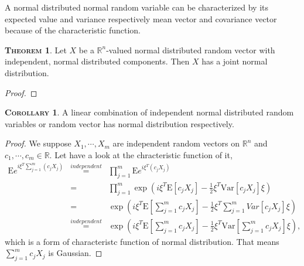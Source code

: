 \documentclass[a4paper, twoside, 11pt]{article}
\theoremstyle{definition}
\newtheorem{theorem}[definition]{\scshape Theorem}
\newtheorem{corollary}[definition]{\scshape Corollary}
\newcommand{\brkt}[1]{\left({#1} \right)}
\begin{document}
A normal distributed normal random variable can be characterized by its expected value and variance respectively mean vector and covariance vector because of the characteristic function.

\begin{theorem}
  Let $X$ be a $\mathbb{R}^{n}$-valued normal distributed random vector with independent, normal distributed components. Then $X$ has a joint normal distribution.
\end{theorem}

\begin{proof}
  
\end{proof}



\begin{corollary}
  A linear combination of independent normal distributed random variables or random vector has normal distribution respectively.
\end{corollary}

\begin{proof}
  We suppose $X_1, \cdots, X_m$ are independent random vectors  on $\mathbb{R}^n$ and $c_1, \cdots, c_m \in \mathbb{R}$. Let have a look at the chracteristic function of it,
  \begin{eqnarray*}
	\mathrm{E}e^{i\xi^T\sum_{j=1}^m(c_jX_j)} &\overset{independent}{=}&\prod_{j=1}^{m} \mathrm{E}e^{i\xi^T(c_jX_j)}\\
	&=& \prod_{j=1}^m \exp\brkt{i\xi^T\mathrm{E}[c_jX_j]-\frac{1}{2}\xi^T\mathrm{Var}[c_jX_j]\xi}\\
	&=&  \exp\brkt{i\xi^T\mathrm{E}[\sum_{j=1}^{m}c_jX_j]-\frac{1}{2}\xi^T\mathrm\sum_{j=1}^{m}{Var}[c_jX_j]\xi}\\
	&\overset{independent}{=}&  \exp\brkt{i\xi^T\mathrm{E}[\sum_{j=1}^{m}c_jX_j]-\frac{1}{2}\xi^T\mathrm{Var}[\sum_{j=1}^{m}c_jX_j]\xi},
  \end{eqnarray*}
  which is a form of characteristc function of normal distribution. That means $\sum_{j=1}^m c_jX_j$ is Gaussian. 
\end{proof}
\end{document}
